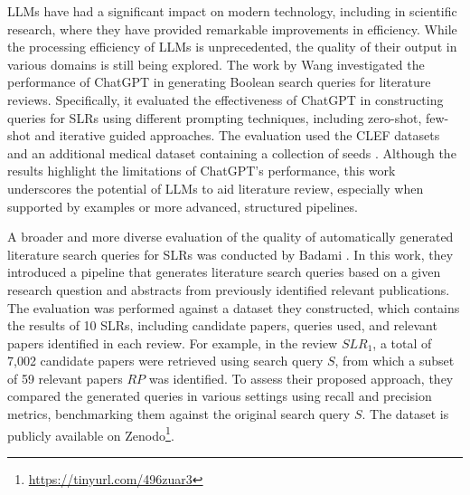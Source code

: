 LLMs have had a significant impact on modern technology, including in scientific research, where they have provided remarkable improvements in efficiency. While the processing efficiency of LLMs is unprecedented, the quality of their output in various domains is still being explored. The work by Wang \autocite{wang2023can} investigated the performance of ChatGPT in generating Boolean search queries for literature reviews. Specifically, it evaluated the effectiveness of ChatGPT in constructing queries for SLRs using different prompting techniques, including zero-shot, few-shot and iterative guided approaches. The evaluation used the CLEF datasets \autocite{kanoulas2017clef, kanoulas2018clef, kanoulas2019clef} and an additional medical dataset containing a collection of seeds \autocite{Wang_2022}. Although the results highlight the limitations of ChatGPT's performance, this work underscores the potential of LLMs to aid literature review, especially when supported by examples or more advanced, structured pipelines.

A broader and more diverse evaluation of the quality of automatically generated literature search queries for SLRs was conducted by Badami \autocite{badami2023adaptive}. In this work, they introduced a pipeline that generates literature search queries based on a given research question and abstracts from previously identified relevant publications. The evaluation was performed against a dataset they constructed, which contains the results of 10 SLRs, including candidate papers, queries used, and relevant papers identified in each review. For example, in the review $SLR_1$, a total of 7,002 candidate papers were retrieved using search query $S$, from which a subset of 59 relevant papers $RP$ was identified. To assess their proposed approach, they compared the generated queries in various settings using recall and precision metrics, benchmarking them against the original search query $S$. The dataset is publicly available on Zenodo\footnote{\url{https://tinyurl.com/496zuar3}}.
